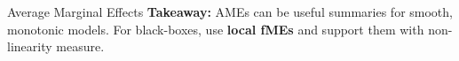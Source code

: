 \documentclass[10pt,compress,t,notes=noshow, xcolor=table]{beamer}
\begin{document}
\begin{frame}{Average Marginal Effects}
\vspace{0.2em}
\textbf{Takeaway:} AMEs can be useful summaries for smooth, monotonic models.  
For black-boxes, use \textbf{local fMEs} and support them with non-linearity measure.

\end{frame}




















\end{document}

